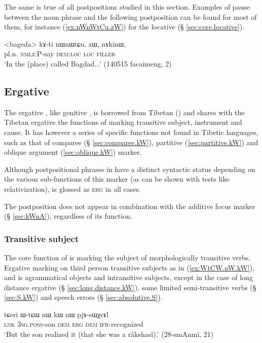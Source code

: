 The same is true of all postpositions studied in this section. Examples of pause between the noun phrase and the following postposition can be found for most of them, for instance (\ref{ex:nWnWtCu.zW}) for the locative  (§ \ref{sec:core.locative}).

\begin{exe}
\ex \label{ex:nWnWtCu.zW}
\gll  <bageda> kɤ-ti nɯnɯtɕu, zɯ, nɤkinɯ, \\
pl.n. \textsc{nmlz}:P-say \textsc{dem}:\textsc{loc} \textsc{loc} \textsc{filler} \\
\glt `In the (place) called Bagdad...' (140515 facaimeng, 2)
\end{exe}

\subsection{Ergative} \label{sec:erg.kW}
The ergative , like genitive , is borrowed from Tibetan (\citealt{jacques16comparative}) and shares with the Tibetan ergative the functions of marking transitive subject, instrument and cause. It has however a series of specific functions not found in Tibetic languages, such as that of comparee (§ \ref{sec:comparee.kW}), partitive (\ref{sec:partitive.kW}) and oblique argument (\ref{sec:oblique.kW}) marker. 

Although postpositional phrases in  have a distinct syntactic status depending on the various sub-functions of this marker (as can be shown with tests like relativization),  is glossed as \textsc{erg} in all cases.

The postposition  does not appear in combination with the additive focus marker  (§ \ref{sec:kWnA}), regardless of its function.

\subsubsection{Transitive subject} \label{sec:A.kW}
The core function of  is marking the subject of morphologically transitive verbs. Ergative marking on third person transitive subjects as in (\ref{ex:WtCW.nW.kW}), and is agrammatical objects and intransitive subjects, except in the case of long distance ergative (§ \ref{sec:long.distance.kW}), some limited semi-transitive verbs (§ \ref{sec:S.kW}) and speech errors (§ \ref{sec:absolutive.S}).

\begin{exe}
\ex \label{ex:WtCW.nW.kW}
\gll tɕeri ɯ-tɕɯ nɯ kɯ nɯ pjɤ-sɯχsɤl \\
\textsc{lnk} \textsc{3sg}.\textsc{poss}-son \textsc{dem} \textsc{erg} \textsc{dem} \textsc{ifr}-recognized \\
\glt `But the son realized it (that she was a râkshasî).' (28-smAnmi, 21)
\end{exe}

